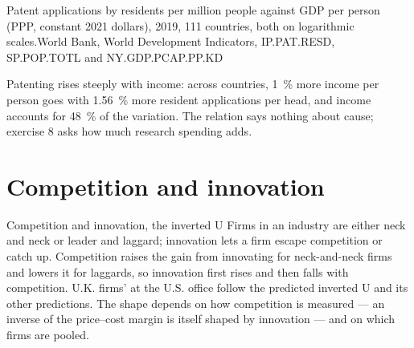 \begin{omchart}{Patent applications by residents per million people against GDP
per person (PPP, constant 2021 dollars), 2019, 111 countries, both on logarithmic
scales.}{World Bank, World Development Indicators, IP.PAT.RESD, SP.POP.TOTL and
NY.GDP.PCAP.PP.KD}
\end{omchart}

Patenting rises steeply with income: across countries, 1~\% more income per person goes
with 1.56~\% more resident  applications per head, and income accounts for 48~\% of
the variation. The relation says nothing about cause; exercise 8 asks how much research
spending adds.

\section{Competition and innovation}\label{sec:b3:platforms-and-innovation:competition}

\begin{model}{Competition and innovation, the inverted U}
\assumes Firms in an industry are either neck and neck or leader and laggard;
innovation lets a firm escape competition or catch up.
\predicts Competition raises the gain from innovating for neck-and-neck firms and
lowers it for laggards, so innovation first rises and then falls with competition.
\tested U.K. firms'  at the U.S.  office follow the predicted inverted U
and its other predictions. %
\breaks The shape depends on how competition is measured --- an inverse of the
price--cost margin is itself shaped by innovation --- and on which firms are
pooled.
\end{model}

